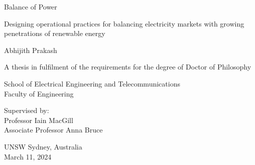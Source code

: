 \documentclass[12pt,a4paper,]{report}
\begin{document}
\begin{titlepage}
    \begin{center}


        \vspace*{2.5cm}

        \huge
        Balance of Power

                \vspace{.5cm}

        \Large
        Designing operational practices for balancing electricity
        markets with growing penetrations of renewable energy
        

        \vspace{1.5cm}

        \Large
        Abhijith Prakash

        \vspace{1.5cm}

        \normalsize
        A thesis in fulfilment of the requirements for the degree of Doctor
of Philosophy

        \vfill

        \normalsize
        School of Electrical Engineering and Telecommunications\\
        Faculty of Engineering\\

        \vfill

        \normalsize
        Supervised by:\\
        Professor Iain MacGill \\ Associate Professor Anna Bruce

        \vspace{0.8cm}


        \normalsize
        UNSW Sydney, Australia\\
        March 11, 2024


    \end{center}
\end{titlepage}
\end{document}
